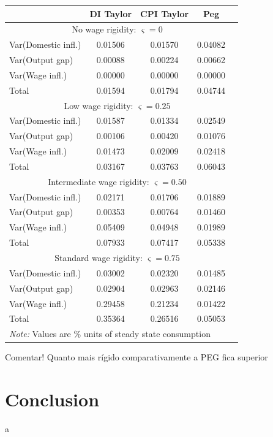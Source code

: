 \documentclass{article}
\begin{document}
\begin{table}[H]
    \centering
    \begin{tabular}{lcccc}
        \hline
        &  DI Taylor & CPI Taylor & Peg\\
        \hline
        \multicolumn{4}{c}{No wage rigidity: $\varsigma = 0$}\\
        Var(Domestic infl.) & 0.01506 & 0.01570 & 0.04082\\
        Var(Output gap) & 0.00088 & 0.00224 & 0.00662\\
        Var(Wage infl.) & 0.00000 & 0.00000 & 0.00000\\
        Total & 0.01594 & 0.01794 & 0.04744\\
        \multicolumn{4}{c}{Low wage rigidity: $\varsigma = 0.25$}\\
        Var(Domestic infl.) & 0.01587 & 0.01334 & 0.02549\\
        Var(Output gap) & 0.00106 & 0.00420 & 0.01076\\
        Var(Wage infl.) & 0.01473 & 0.02009 & 0.02418\\
        Total & 0.03167 & 0.03763 & 0.06043\\
        \multicolumn{4}{c}{Intermediate wage rigidity: $\varsigma = 0.50$}\\
        Var(Domestic infl.) & 0.02171 & 0.01706 & 0.01889\\
        Var(Output gap) & 0.00353 & 0.00764 & 0.01460\\
        Var(Wage infl.) & 0.05409 & 0.04948 & 0.01989\\
        Total & 0.07933 & 0.07417 & 0.05338\\
        \multicolumn{4}{c}{Standard wage rigidity: $\varsigma = 0.75$}\\
        Var(Domestic infl.) & 0.03002 & 0.02320 & 0.01485\\
        Var(Output gap) & 0.02904 & 0.02963 & 0.02146\\
        Var(Wage infl.) & 0.29458 & 0.21234 & 0.01422\\
        Total & 0.35364 & 0.26516 & 0.05053\\
        \hline
        \multicolumn{4}{l}{\textit{Note: } Values are \% units of steady state consumption}
    \end{tabular}
\end{table}

Comentar! Quanto mais rígido comparativamente a PEG fica superior

\section{Conclusion}
a
\end{document}
